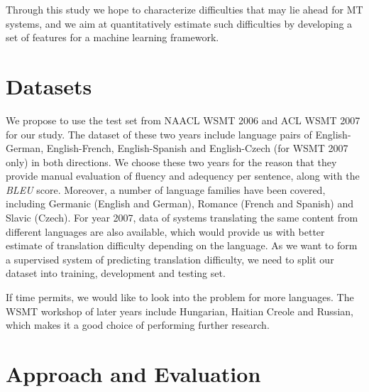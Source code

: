 \documentclass[11pt]{article}
\begin{document}
Through this study we hope to characterize difficulties that may lie ahead for MT systems, and we aim at quantitatively estimate such difficulties by developing a set of features for a machine learning framework.

\section{Datasets}
We propose to use the test set from NAACL WSMT 2006 \cite{WMT:2006} and ACL WSMT 2007 \cite{WMT:2007} for our study. 
The dataset of these two years include language pairs of English-German, English-French, English-Spanish and English-Czech (for WSMT 2007 only) in both directions. 
We choose these two years for the reason that they provide manual evaluation of fluency and adequency per sentence, along with the \emph{BLEU} score.
Moreover, a number of language families have been covered, including Germanic (English and German), Romance (French and Spanish) and Slavic (Czech). 
For year 2007, data of systems translating the same content from different languages are also available, which would provide us with better estimate of translation difficulty depending on the language.
As we want to form a supervised system of predicting translation difficulty, we need to split our dataset into training, development and testing set. 

If time permits, we would like to look into the problem for more languages. 
The WSMT workshop of later years include Hungarian, Haitian Creole and Russian, which makes it a good choice of performing further research. 

\section{Approach and Evaluation}
\end{document}
